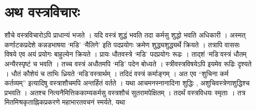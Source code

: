 \section*{अथ वस्त्रविचारः}

शौचे वस्त्रविचारोऽपि प्राधान्यं भजते । यदि वस्त्रं शुद्धं भवति तदा कर्मसु शुद्धो भवति अधिकारी । अस्मत् कर्णाटकप्रदेशे कन्नडभाषया ‘मडि’ ‘मैलिगे’ इति पदप्रयोगः क्रमेण शुद्ध्यशुद्ध्यर्थे क्रियते । तत्रापि वाससः विषये एव अयं प्रयोगः बाहुल्येन क्रियते । प्रायः धौतवस्त्रे ‘मडि’ पदप्रयोगः रूढः । ताद्शं ‘मडि’वस्त्रं धौतम् अन्यैरस्पृष्टं च भवति । तच्च वस्त्रं अधौतमपि ‘मडि’ पदेन बोध्यते । स्त्रीवस्त्रविषयेऽपि इयमेव रूढिः दृश्यते । धौतं कौशेयं च ताभिः ध्रियते ‘मडि’वस्त्रार्थम् । तदिदं वस्त्रं कर्माङ्गम् । अत एव “शुचिना कर्म कर्तव्यम्” इत्यादिषु वस्त्राशौचमपि अन्तर्हितं वर्तते । यथा आचमनस्नानादिना शुद्धिः , अशुचिवस्त्रेणाशुद्धिश्च प्रभवति । अतश्च नित्यनैमित्तिककाम्यकर्मसु वस्त्रशौचं सुतरामपेक्षितम् । तदर्थं वस्त्रविधयः स्मृताः । तत्र मितमिश्रकृताह्निकप्रकरणे महाभारतवचनं स्मर्यते, यथा

